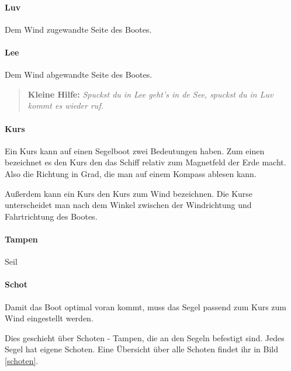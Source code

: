 \documentclass[12pt]{article}
\begin{document}
\paragraph{Luv}
Dem Wind zugewandte Seite des Bootes.

\paragraph{Lee}
Dem Wind abgewandte Seite des Bootes.

\begin{quote}
\textbf{Kleine Hilfe:} \textit{Spuckst du in Lee geht's in de See, spuckst du in Luv kommt es wieder ruf.}
\end{quote}

\paragraph{Kurs}
Ein Kurs kann auf einen Segelboot zwei Bedeutungen haben. Zum einen bezeichnet es den Kurs den das Schiff relativ zum Magnetfeld der Erde macht. Also die Richtung in Grad, die man auf einem Kompass ablesen kann.

Außerdem kann ein Kurs den Kurs zum Wind bezeichnen. Die Kurse unterscheidet man nach dem Winkel zwischen der Windrichtung und Fahrtrichtung des Bootes.

\paragraph{Tampen}
Seil

\paragraph{Schot}
Damit das Boot optimal voran kommt, muss das Segel passend zum Kurs zum Wind eingestellt werden.

Dies geschieht über Schoten - Tampen, die an den Segeln befestigt sind. Jedes Segel hat eigene Schoten. Eine Übersicht über alle Schoten findet ihr in Bild \ref{schoten}.
\end{document}
